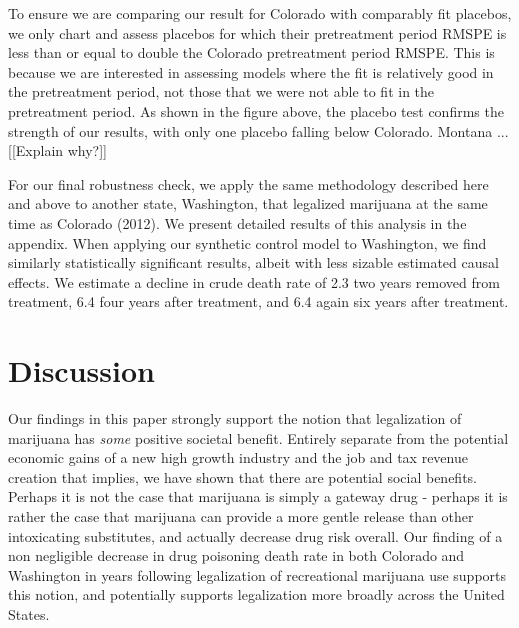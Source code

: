 \documentclass{article}
\begin{document}
To ensure we are comparing our result for Colorado with comparably fit placebos, we only chart and assess placebos for which their pretreatment period RMSPE is less than or equal to double the Colorado pretreatment period RMSPE. This is because we are interested in assessing models where the fit is relatively good in the pretreatment period, not those that we were not able to fit in the pretreatment period. As shown in the figure above, the placebo test confirms the strength of our results, with only one placebo falling below Colorado.  Montana ... [[Explain why?]]

For our final robustness check, we apply the same methodology described here and above to another state, Washington, that legalized marijuana at the same time as Colorado (2012). We present detailed results of this analysis in the appendix. When applying our synthetic control model to Washington, we find similarly statistically significant results, albeit with less sizable estimated causal effects. We estimate a decline in crude death rate of 2.3 two years removed from treatment, 6.4 four years after treatment, and 6.4 again six years after treatment.

\section{Discussion}

Our findings in this paper strongly support the notion that legalization of marijuana has \emph{some} positive societal benefit. Entirely separate from the potential economic gains of a new high growth industry and the job and tax revenue creation that implies, we have shown that there are potential social benefits. Perhaps it is not the case that marijuana is simply a gateway drug - perhaps it is rather the case that marijuana can provide a more gentle release than other intoxicating substitutes, and actually decrease drug risk overall. Our finding of a non negligible decrease in drug poisoning death rate in both Colorado and Washington in years following legalization of recreational marijuana use supports this notion, and potentially supports legalization more broadly across the United States.
\end{document}
